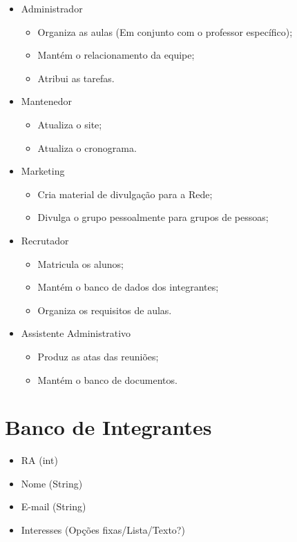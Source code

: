 \documentclass[a4paper,11pt]{report}
\numberwithin{equation}{section}
\begin{document}
\begin{itemize}
  \item Administrador
  \begin{itemize}
    \item Organiza as aulas (Em conjunto com o professor específico);
    \item Mantém o relacionamento da equipe;
    \item Atribui as tarefas.
  \end{itemize}
  \item Mantenedor
  \begin{itemize}
    \item Atualiza o site;
    \item Atualiza o cronograma.
  \end{itemize}
  \item Marketing
  \begin{itemize}
    \item Cria material de divulgação para a Rede;
    \item Divulga o grupo pessoalmente para grupos de pessoas;
  \end{itemize}
  \item Recrutador
  \begin{itemize}
    \item Matricula os alunos;
    \item Mantém o banco de dados dos integrantes;
    \item Organiza os requisitos de aulas.
  \end{itemize}
  \item Assistente Administrativo
  \begin{itemize}
    \item Produz as atas das reuniões;
    \item Mantém o banco de documentos.
  \end{itemize}
\end{itemize}

\chapter{Banco de Integrantes}

\begin{itemize}
  \item RA (int)
  \item Nome (String)
  \item E-mail (String)
  \item Interesses (Opções fixas/Lista/Texto?)
\end{itemize}
\end{document}
